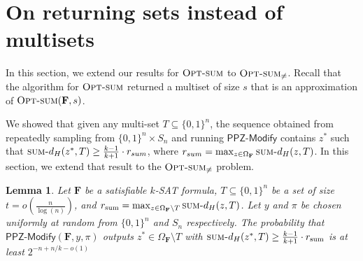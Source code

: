 \documentclass[11pt, letterpaper]{article}
\newtheorem{lemma}[theorem]{Lemma}
\theoremstyle{definition}
\newcommand{\f}{\mathbf{F}}
\newcommand{\Om}{\Omega_{\f}}
\newcommand{\sumd}{\textsc{sum-}d_H}
\newcommand{\opts}{\textsc{Opt-sum}}
\newcommand{\PPZMod}{\textsf{PPZ-Modify}}
\begin{document}
 \section{On returning sets instead of multisets}
\label{app:distinctsum}
In this section, we extend our results for $\opts$ to $\opts_{\neq}$. Recall that the algorithm for $\opts$ returned a multiset of size $s$ that is an approximation of $\opts(\f,s)$. 

We showed that given any multi-set $T \subseteq \{0,1\}^n$, the sequence obtained from repeatedly sampling from $\{0,1\}^n \times S_n$ and running $\PPZMod$ contains $z^*$ such that $\sumd(z^*, T) \geq \frac{k-1}{k+1} \cdot r_{sum}$, where $r_{sum}=\max_{z \in \Om} \sumd(z, T)$. In this section, we extend that result to the $\opts_{\neq}$ problem. 

\begin{lemma}\label{lem:anchor:sumdistinct}
    Let $\f$ be a satisfiable $k$-SAT formula, $T \subseteq \{0,1\}^n$ be a set of size $t = o \left(\frac{n}{\log(n)}\right)$, and $r_{\text{sum}}= \max_{z \in \Om \setminus T}\sumd (z,T)$. Let $y$ and $\pi$ be chosen uniformly at random from $\{0,1\}^n$ and $S_n$ respectively. The probability that $\PPZMod(\f, y, \pi)$ outputs $z^* \in \Om \setminus T$ with $\sumd(z^*,T) \geq \frac{k-1}{k+1} \cdot r_{\text{sum}}$ is at least $ 2^{-n+n/k-o(1)}$
\end{lemma}
\end{document}
